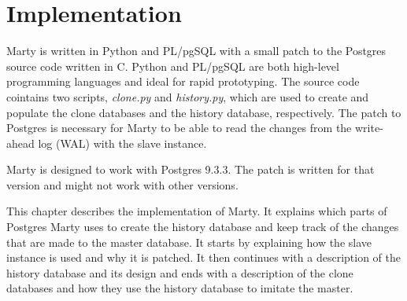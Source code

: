 \chapter{Implementation}
Marty is written in Python and PL/pgSQL with a small patch to the Postgres source code written in C.
Python and PL/pgSQL are both high-level programming languages and ideal for rapid prototyping.
The source code cointains two scripts, \textit{clone.py} and \textit{history.py}, which are used to create and populate the clone databases and the history database, respectively.
The patch to Postgres is necessary for Marty to be able to read the changes from the write-ahead log (WAL) with the slave instance.

Marty is designed to work with Postgres 9.3.3.
The patch is written for that version and might not work with other versions.

This chapter describes the implementation of Marty.
It explains which parts of Postgres Marty uses to create the history database and keep track of the changes that are made to the master database.
It starts by explaining how the slave instance is used and why it is patched.
It then continues with a description of the history database and its design and ends with a description of the clone databases and how they use the history database to imitate the master.




